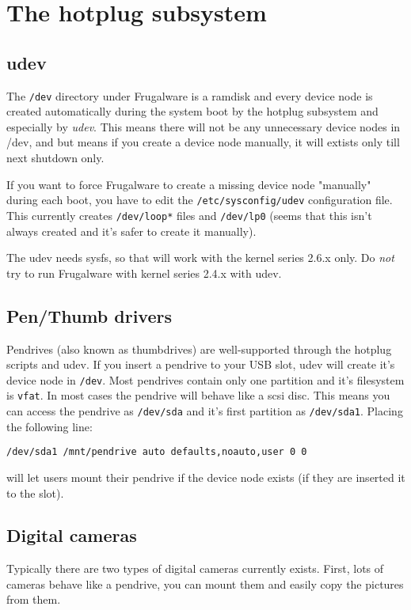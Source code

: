 \chapter{The hotplug subsystem}
\section{udev}

The {\tt /dev} directory under Frugalware is a ramdisk and every device node is created automatically during the system boot by the hotplug subsystem and especially by \textit{udev}. This means there will not be any unnecessary device nodes in /dev, and but means if you create a device node manually, it will extists only till next shutdown only.

If you want to force Frugalware to create a missing device node "manually" during each boot, you have to edit the {\tt /etc/sysconfig/udev} configuration file. This currently creates {\tt /dev/loop*} files and {\tt /dev/lp0} (seems that this isn't always created and it's safer to create it manually). 

The udev needs sysfs, so that will work with the kernel series 2.6.x only. Do \textit{not} try to run Frugalware with kernel series 2.4.x with udev.

\section{Pen/Thumb drivers}

Pendrives (also known as thumbdrives) are well-supported through the hotplug scripts and udev. If you insert a pendrive to your USB slot, udev will create it's device node in {\tt /dev}. Most pendrives contain only one partition and it's filesystem is {\tt vfat}. In most cases the pendrive will behave like a scsi disc. This means you can access the pendrive as {\tt /dev/sda} and it's first partition as {\tt /dev/sda1}. Placing the following line:

{\tt /dev/sda1        /mnt/pendrive    auto        defaults,noauto,user 0 0}

will let users mount their pendrive if the device node exists (if they are inserted it to the slot).

\section{Digital cameras}

Typically there are two types of digital cameras currently exists. First, lots of cameras behave like a pendrive, you can mount them and easily copy the pictures from them.

